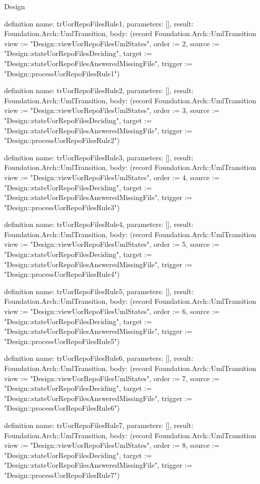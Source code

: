 \begin{lexlean}{Design}
\begin{semanticmodule}
definition{
  name: trUorRepoFilesRule1,
  parameters: [],
  result: Foundation.Arch::UmlTransition,
  body: (record Foundation.Arch::UmlTransition {view := "Design::viewUorRepoFilesUmlStates", order := 2, source := "Design::stateUorRepoFilesDeciding", target := "Design::stateUorRepoFilesAnsweredMissingFile", trigger := "Design::processUorRepoFilesRule1"})
}

definition{
  name: trUorRepoFilesRule2,
  parameters: [],
  result: Foundation.Arch::UmlTransition,
  body: (record Foundation.Arch::UmlTransition {view := "Design::viewUorRepoFilesUmlStates", order := 3, source := "Design::stateUorRepoFilesDeciding", target := "Design::stateUorRepoFilesAnsweredMissingFile", trigger := "Design::processUorRepoFilesRule2"})
}

definition{
  name: trUorRepoFilesRule3,
  parameters: [],
  result: Foundation.Arch::UmlTransition,
  body: (record Foundation.Arch::UmlTransition {view := "Design::viewUorRepoFilesUmlStates", order := 4, source := "Design::stateUorRepoFilesDeciding", target := "Design::stateUorRepoFilesAnsweredMissingFile", trigger := "Design::processUorRepoFilesRule3"})
}

definition{
  name: trUorRepoFilesRule4,
  parameters: [],
  result: Foundation.Arch::UmlTransition,
  body: (record Foundation.Arch::UmlTransition {view := "Design::viewUorRepoFilesUmlStates", order := 5, source := "Design::stateUorRepoFilesDeciding", target := "Design::stateUorRepoFilesAnsweredMissingFile", trigger := "Design::processUorRepoFilesRule4"})
}

definition{
  name: trUorRepoFilesRule5,
  parameters: [],
  result: Foundation.Arch::UmlTransition,
  body: (record Foundation.Arch::UmlTransition {view := "Design::viewUorRepoFilesUmlStates", order := 6, source := "Design::stateUorRepoFilesDeciding", target := "Design::stateUorRepoFilesAnsweredMissingFile", trigger := "Design::processUorRepoFilesRule5"})
}

definition{
  name: trUorRepoFilesRule6,
  parameters: [],
  result: Foundation.Arch::UmlTransition,
  body: (record Foundation.Arch::UmlTransition {view := "Design::viewUorRepoFilesUmlStates", order := 7, source := "Design::stateUorRepoFilesDeciding", target := "Design::stateUorRepoFilesAnsweredMissingFile", trigger := "Design::processUorRepoFilesRule6"})
}

definition{
  name: trUorRepoFilesRule7,
  parameters: [],
  result: Foundation.Arch::UmlTransition,
  body: (record Foundation.Arch::UmlTransition {view := "Design::viewUorRepoFilesUmlStates", order := 8, source := "Design::stateUorRepoFilesDeciding", target := "Design::stateUorRepoFilesAnsweredMissingFile", trigger := "Design::processUorRepoFilesRule7"})
}


\end{semanticmodule}
\end{lexlean}
